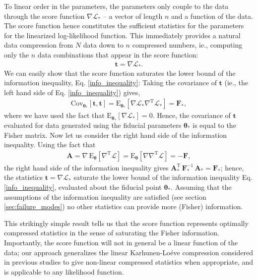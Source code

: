 \documentclass[fleqn,usenatbib]{mnras}
\def\btheta{\boldsymbol{\theta}}
\def\bdtwidle{\mathbf{t}}
\def\fisher{\mathbf{F}}
\def\transpose{\mathrm{T}}
\def\L{\mathcal{L}}
\def\transpose{\mathrm{T}}
\begin{document}
To linear order in the parameters, the parameters only couple to the data through the score function $\nabla\L_*$ -- a vector of length $n$ and a function of the data. The score function hence constitutes the sufficient statistics for the parameters for the linearized log-likelihood function. This immediately provides a natural data compression from $N$ data down to $n$ compressed numbers, ie., computing only the $n$ data combinations that appear in the score function:
\begin{align}
\label{score}
\bdtwidle = \nabla\L_*.
\end{align}
We can easily show that the score function saturates the lower bound of the information inequality, Eq. \eqref{info_inequality}: Taking the covariance of $\mathbf{t}$ (ie., the left hand side of Eq. \ref{info_inequality}) gives,
\begin{align}
\mathrm{Cov}_{\btheta_*}\left[\mathbf{t},\mathbf{t}\right] = \mathrm{E}_{\btheta_*}\left[\nabla\mathcal{L}_*\nabla^\transpose\mathcal{L}_*\right] = \mathbf{F}_*,
\end{align}
where we have used the fact that $\mathrm{E}_{\btheta_*}\left[\nabla\mathcal{L}_*\right]=0$. Hence, the covariance of $\mathbf{t}$ evaluated for data generated using the fiducial parameters $\btheta_*$ is equal to the Fisher matrix. Now let us consider the right hand side of the information inequality. Using the fact that \begin{align}
\mathbf{A}=\nabla\,\mathrm{E}_{\btheta}\left[\nabla^\transpose\mathcal{L}\right]=\mathrm{E}_{\btheta}\left[\nabla \nabla^\transpose\mathcal{L}\right]=-\mathbf{F},
\label{exchangeDiffAndInt}
\end{align}
the right hand side of the information inequality gives 
$\mathbf{A}_*^\transpose\,\fisher^{-1}_*\,\mathbf{A}_* = \mathbf{F}_*$;
hence, the statistics $\mathbf{t}=\nabla\L_*$ saturate the lower bound of the information inequality Eq. \eqref{info_inequality}, evaluated about the fiducial point $\btheta_*$. Assuming that the assumptions of the information inequality are satisfied (see section \ref{sec:failure_modes}) no other statistics can provide more (Fisher) information.

This strikingly simple result tells us that the score function represents optimally compressed statistics in the sense of saturating the Fisher information. Importantly, the score function will not in general be a linear function of the data; our approach generalizes the linear Karhunen-Lo\'{e}ve compression considered in previous studies \citep{Tegmark1997, Heavens2000a} to give non-linear compressed statistics when appropriate, and is applicable to any likelihood function. 
%
\end{document}
